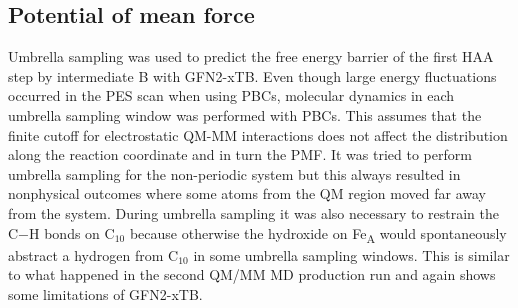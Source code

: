 \subsection{Potential of mean force}
Umbrella sampling was used to predict the free energy barrier of the first HAA step by intermediate B with GFN2-xTB. Even though large energy fluctuations occurred in the PES scan when using PBCs, molecular dynamics in each umbrella sampling window was performed with PBCs. This assumes that the finite cutoff for electrostatic QM-MM interactions does not affect the distribution along the reaction coordinate and in turn the PMF. It was tried to perform umbrella sampling for the non-periodic system but this always resulted in nonphysical outcomes where some atoms from the QM region moved far away from the system. During umbrella sampling it was also necessary to restrain the C$-$H bonds on C$_{10}$ because otherwise the hydroxide on Fe\textsubscript{A} would spontaneously abstract a hydrogen from C$_{10}$ in some umbrella sampling windows. This is similar to what happened in the second QM/MM MD production run and again shows some limitations of GFN2-xTB. 

